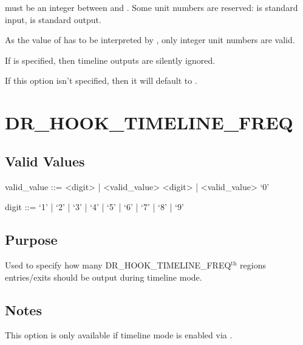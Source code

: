 \documentclass[letterpaper,10pt,english]{sphinxmanual}
\begin{document}
\sphinxAtStartPar
{} must be an integer between  and . Some unit numbers are reserved:  is standard input,  is standard output.

\sphinxAtStartPar
As the value of  has to be interpreted by , only integer unit numbers are valid.

\sphinxAtStartPar
If  is specified, then timeline outputs are silently ignored.

\sphinxAtStartPar
If this option isn’t specified, then it will default to .


\section{DR\_HOOK\_TIMELINE\_FREQ}
\label{\detokenize{flag/flag:dr-hook-timeline-freq}}\label{\detokenize{flag/flag:id112}}

\subsection{Valid Values}
\label{\detokenize{flag/flag:id113}}
\begin{DUlineblock}{0em}
\item[] valid\_value ::= \textless{}digit\textgreater{} | \textless{}valid\_value\textgreater{} \textless{}digit\textgreater{} | \textless{}valid\_value\textgreater{} ‘0’
\item[] digit ::= ‘1’ | ‘2’ | ‘3’ | ‘4’ | ‘5’ | ‘6’ | ‘7’ | ‘8’ | ‘9’
\end{DUlineblock}


\subsection{Purpose}
\label{\detokenize{flag/flag:id114}}
\sphinxAtStartPar
Used to specify how many DR\_HOOK\_TIMELINE\_FREQ$^{\text{th}}$ regions entries/exits should be output during timeline mode.


\subsection{Notes}
\label{\detokenize{flag/flag:id115}}
\sphinxAtStartPar
This option is only available if timeline mode is enabled via {\hyperref[\detokenize{flag/flag:dr-hook-timeline}]{}}.
\end{document}
